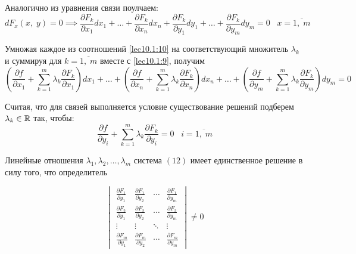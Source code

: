 \documentclass[../../main.tex]{subfiles}
\begin{document}
	Аналогично из уравнения связи поулчаем:
	\begin{equation}
	dF_x\left(x, \; y\right) = 0 \implies \dfrac{\partial 
	F_k}{\partial x_1}dx_1 + 
	\ldots + \dfrac{\partial F_k}{\partial x_n}dx_n + 
	\dfrac{\partial F_k}{\partial y_1}dy_1 + \ldots + 
	\dfrac{\partial F_k}{\partial y_m}dy_m = 0 \;\;\; x = \overline{1, \; m} 
	\label{lec10.1:10}
	\end{equation}
	
	Умножая каждое из соотношений \eqref{lec10.1:10} на соответствующий множитель 
	$\lambda_k$ и суммируя для $k = \overline{1,\;m}$ 
	вместе с \eqref{lec10.1:9}, получим
	\begin{equation}
	\left(\dfrac{\partial f}{\partial x_1} + \sum\limits_{k
	= 1}^m \lambda_k \dfrac{\partial F_k}{\partial x_1} 
	\right)dx_1 + \ldots + \left(\dfrac{\partial f}
	{\partial x_n} + \sum\limits_{k = 1}^m \lambda_k 
	\dfrac{\partial F_k}{\partial x_n} \right)dx_n + \ldots 
	+ \left(\dfrac{\partial f}{\partial y_m} + 
	\sum\limits_{k = 1}^m \lambda_k \dfrac{\partial F_k}
	{\partial y_m} \right)dy_m = 0 \label{lec10.1:11}
	\end{equation}
	
	Считая, что для связей выполняется условие существование 
	решений подберем $\lambda_k \in \mathbb{R}$ так, чтобы:
	\begin{equation}
	\dfrac{\partial f}{\partial y_i} + \sum\limits_{k = 1}^m \lambda_k 
	\dfrac{\partial F_k}{\partial y_i} = 0 \;\;\; i = \overline{1, \; m} 
	\label{lec10.1:12}
	\end{equation}
	
	Линейные отношения $\lambda_1, \lambda_2, \ldots, \lambda_m$ система 
	$\left( 12 \right) $ %
	имеет единственное решение в силу того, что определитель
	
	\begin{equation}
	\label{QQQQQQQQQQQQQQQQQQQQQQQQQQQQQQQQQQkek_label_1}
	\begin{vmatrix}
	\frac{\partial F_1}{\partial y_1} & \frac{\partial F_1}{\partial y_2}
	& \cdots & \frac{\partial F_1}{\partial y_m} \\
	\frac{\partial F_2}{\partial y_1} & \frac{\partial F_2}{\partial y_2} 
	& \cdots & \frac{\partial F_2}{\partial y_m} \\
	\vdots  & \vdots  & \ddots & \vdots  \\
	\frac{\partial F_m}{\partial y_1} & \frac{\partial F_m}{\partial y_2}
	& \cdots & \frac{\partial F_m}{\partial y_m}
	\end{vmatrix} \ne 0 
	\end{equation}
	\smallskip
	
\end{document}
